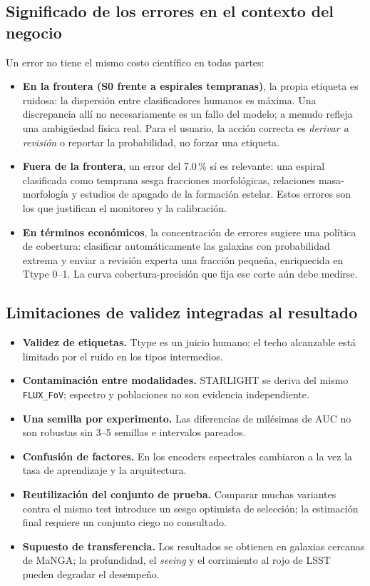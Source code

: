 \subsection{Significado de los errores en el contexto del negocio}
Un error no tiene el mismo costo científico en todas partes:
\begin{itemize}
  \item \textbf{En la frontera (S0 frente a espirales tempranas)}, la propia etiqueta es ruidosa: la dispersión entre clasificadores humanos es máxima. Una discrepancia allí no necesariamente es un fallo del modelo; a menudo refleja una ambigüedad física real. Para el usuario, la acción correcta es \emph{derivar a revisión} o reportar la probabilidad, no forzar una etiqueta.
  \item \textbf{Fuera de la frontera}, un error del 7.0\,\% sí es relevante: una espiral clasificada como temprana sesga fracciones morfológicas, relaciones masa-morfología y estudios de apagado de la formación estelar. Estos errores son los que justifican el monitoreo y la calibración.
  \item \textbf{En términos económicos}, la concentración de errores sugiere una política de cobertura: clasificar automáticamente las galaxias con probabilidad extrema y enviar a revisión experta una fracción pequeña, enriquecida en Ttype 0--1. La curva cobertura-precisión que fija ese corte aún debe medirse.
\end{itemize}

\subsection{Limitaciones de validez integradas al resultado}
\begin{itemize}
  \item \textbf{Validez de etiquetas.} Ttype es un juicio humano; el techo alcanzable está limitado por el ruido en los tipos intermedios.
  \item \textbf{Contaminación entre modalidades.} STARLIGHT se deriva del mismo \texttt{FLUX\_FoV}; espectro y poblaciones no son evidencia independiente.
  \item \textbf{Una semilla por experimento.} Las diferencias de milésimas de AUC no son robustas sin 3--5 semillas e intervalos pareados.
  \item \textbf{Confusión de factores.} En los encoders espectrales cambiaron a la vez la tasa de aprendizaje y la arquitectura.
  \item \textbf{Reutilización del conjunto de prueba.} Comparar muchas variantes contra el mismo test introduce un sesgo optimista de selección; la estimación final requiere un conjunto ciego no consultado.
  \item \textbf{Supuesto de transferencia.} Los resultados se obtienen en galaxias cercanas de MaNGA; la profundidad, el \emph{seeing} y el corrimiento al rojo de LSST pueden degradar el desempeño.
\end{itemize}

